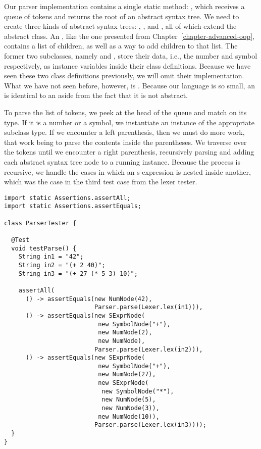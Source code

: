 Our parser implementation contains a single static method: , which receives a queue of tokens and returns the root of an abstract syntax tree. We need to create three kinds of abstract syntax trees: , , and , all of which extend the abstract  class. An , like the one presented from Chapter~\ref{chapter-advanced-oop}, contains a list of children, as well as a way to add children to that list. The former two subclasses, namely  and , store their data, i.e., the number and symbol respectively, as instance variables inside their class definitions. Because we have seen these two class definitions previously, we will omit their implementation. What we have not seen before, however, is . Because our language is so small, an  is identical to an  aside from the fact that it is not abstract.

To parse the list of tokens, we peek at the head of the queue and match on its type. If it is a number or a symbol, we instantiate an instance of the appropriate subclass type. If we encounter a left parenthesis, then we must do more work, that work being to parse the contents inside the parentheses. We traverse over the tokens until we encounter a right parenthesis, recursively parsing and adding each abstract syntax tree node to a running  instance. Because the process is recursive, we handle the cases in which an s-expression is nested inside another, which was the case in the third test case from the lexer tester.

\begin{lstlisting}[language=MyJava]
import static Assertions.assertAll;
import static Assertions.assertEquals;

class ParserTester {

  @Test
  void testParse() {
    String in1 = "42";
    String in2 = "(+ 2 40)";
    String in3 = "(+ 27 (* 5 3) 10)";

    assertAll(
      () -> assertEquals(new NumNode(42), 
                         Parser.parse(Lexer.lex(in1))),
      () -> assertEquals(new SExprNode(
                          new SymbolNode("+"),
                          new NumNode(2),
                          new NumNode), 
                         Parser.parse(Lexer.lex(in2))),
      () -> assertEquals(new SExprNode(
                          new SymbolNode("+"),
                          new NumNode(27),
                          new SExprNode(
                           new SymbolNode("*"),
                           new NumNode(5),
                           new NumNode(3)),
                          new NumNode(10)), 
                         Parser.parse(Lexer.lex(in3))));
  }
}
\end{lstlisting}

